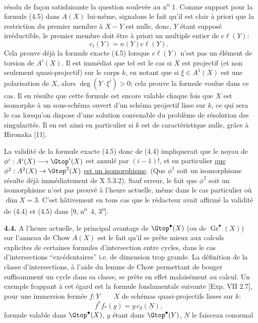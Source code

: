 
résolu de
façon satisfaisante la question soulevée au n\textsuperscript{o} 1. Comme support pour la formule (4.5) dans $A(X)$ lui-même, signalons le fait qu'il est clair à priori que la restriction du premier membre à $X-Y$ est nulle, donc, $Y$ étant supposé irréductible, le premier membre doit être à priori un multiple entier de $\mathrm{c}\ell(Y)$:
\[
 c_i(Y)=n(Y)\mathrm{c}\ell(Y).
\]
Cela prouve déjà la formule exacte (4.5) lorsque $\mathrm{c}\ell(Y)$ n'est pas un élément de torsion de $A^i(X)$. Il est immédiat que tel est le cas si $X$ est projectif (et non seulement quasi-projectif) sur le corps $k$, en notant que si $\xi\in A^1(X)$ est une polarisation de $X$, alors $\deg(Y\cdot\xi^i)>0$; cela prouve la formule voulue dans ce cas. Il en résulte que cette formule est encore valable chaque fois que $X$ est isomorphe à un sous-schéma ouvert d'un schéma projectif lisse sur $k$, ce qui sera le cas lorsqu'on dispose d'une solution convenable du problème de résolution des singularités. Il en est ainsi en particulier si $k$ est de caractéristique nulle, grâce à Hironaka [11].

La validité de la formule exacte (4.5) donc de (4.4) impliquerait que le noyau de $\phi^i:A^i(X)\longrightarrow \Gtop^i(X)$ est annulé par $(i-1)!$, et en particulier \uline{que} $\phi^2:A^2(X)\to\Gtop^2(X)$ \uline{est un isomorphisme}. (Que $\phi^1$ soit un isomorphisme résulte déjà immédiatement de X 5.3.2). Sauf erreur, le fait que $\phi^2$ soit un isomorphisme n'est pas prouvé à l'heure actuelle, même dans le cas particulier où $\dim X=3$. C'est hâtivement en tous cas que le rédacteur avait affirmé la validité de (4.4) et (4.5) dans [9, n\textsuperscript{o}~4, 3\textsuperscript{o}].

\textbf{4.4.} A l'heure actuelle, le principal avantage de $\Gtop^\bullet(X)$ (ou de $\operatorname{Gr}^\bullet(X)$) sur l'anneau de Chow $A(X)$ est le fait qu'il se prête mieux aux calculs explicites de certaines formules d'intersection entre cycles, dans le cas d'intersections ``excédentaires'' i.e. de dimension trop grande. La définition de la classe d'intersections, à l'aide du lemme de Chow permettant de bouger suffisamment un cycle dans sa classe, se prête en effet malaisément au calcul. Un exemple frappant à cet égard est la formule fondamentale suivante [Exp. VII 2.7], pour une immersion fermée $f:Y\qquad X$ de schémas quasi-projectifs lisses sur $k$:
\begin{equation}\tag{4.6}
 f^*f_*(y)=y\,c_d(\underline{N}),
\end{equation}
formule valable dans $\Gtop^\bullet(X)$, $y$ étant dans $\Gtop^\bullet(Y)$, $\underline{N}$ le faisceau conormal 
